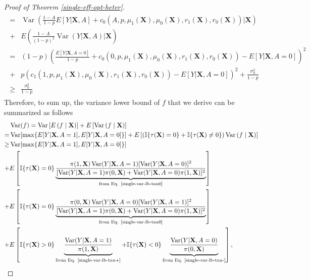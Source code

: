 \documentclass[11pt]{article}
\theoremstyle{referenceplain}
\theoremstyle{referencedefinition}
\theoremstyle{referenceremark}
\begin{document}
\begin{proof}[Proof of Theorem \ref{single-eff-opt-heter}]
\begin{align}
\begin{aligned}
        =&\operatorname{Var}\left(\frac{1-A}{1-p}E[Y|\mathbf{X},A]+c_0(A,p,\mu_1(\mathbf{X}),\mu_0(\mathbf{X}),r_1(\mathbf{X}),r_0(\mathbf{X}))\bigg|\mathbf{X}\right)\\
        +& E\left(\frac{1-A}{(1-p)^2}\operatorname{Var}(Y|\mathbf{X},A)\bigg|\mathbf{X}\right)\\
        =& (1-p)\left(\frac{E[Y|\mathbf{X},A=0]}{1-p}+c_0(0,p,\mu_1(\mathbf{X}),\mu_0(\mathbf{X}),r_1(\mathbf{X}),r_0(\mathbf{X}))-E[Y|\mathbf{X},A=0]\right)^2\\
        +&p\left(c_1(1,p,\mu_1(\mathbf{X}),\mu_0(\mathbf{X}),r_1(\mathbf{X}),r_0(\mathbf{X}))-E[Y|\mathbf{X},A=0]\right)^2+\frac{\sigma_0^2}{1-p}\\
        \ge & \frac{\sigma_0^2}{1-p}
        \end{aligned}
    \end{align}   
Therefore, to sum up, the variance lower bound of $f$ that we derive can be summarized as follows
\begin{align*}
    &\operatorname{Var}(f)=\operatorname{Var}\left[E\left(f\mid \mathbf{X}\right)\right]+E\left[\operatorname{Var}\left(f\mid \mathbf{X}\right)\right] \\
    =&\operatorname{Var}[\max\{E[Y|\mathbf{X},A=1],E[Y|\mathbf{X},A=0]\}]+E\left[(\mathbb{I}\{\tau(\mathbf{X})=0\}+\mathbb{I}\{\tau(\mathbf{X})\neq0\})\operatorname{Var}\left(f\mid \mathbf{X}\right)\right]\\
    \ge&\operatorname{Var}[\max\{E[Y|\mathbf{X},A=1],E[Y|\mathbf{X},A=0]\}]\\
    +&E\left[\mathbb{I}\{\tau(\mathbf{X})=0\}\underbrace{\frac{\pi(1,\mathbf{X})\operatorname{Var}(Y|\mathbf{X},A=1)[\operatorname{Var}(Y|\mathbf{X},A=0)]^2}{[\operatorname{Var}(Y|\mathbf{X},A=1)\pi(0,\mathbf{X})+\operatorname{Var}(Y|\mathbf{X},A=0)\pi(1,\mathbf{X})]^2}}_{\text{from Eq. \eqref{single-var-lb-tau0}}}\right]\\
    +&E\left[\mathbb{I}\{\tau(\mathbf{X})=0\}\underbrace{\frac{\pi(0,\mathbf{X})\operatorname{Var}(Y|\mathbf{X},A=0)[\operatorname{Var}(Y|\mathbf{X},A=1)]^2}{[\operatorname{Var}(Y|\mathbf{X},A=1)\pi(0,\mathbf{X})+\operatorname{Var}(Y|\mathbf{X},A=0)\pi(1,\mathbf{X})]^2}}_{\text{from Eq. \eqref{single-var-lb-tau0}}}\right]\\
    +&E\left[\mathbb{I}\{\tau(\mathbf{X})>0\}\underbrace{\frac{\operatorname{Var}(Y|\mathbf{X},A=1)}{\pi(1,\mathbf{X})}}_{\text{from Eq. \eqref{single-var-lb-tau+}}}+\mathbb{I}\{\tau(\mathbf{X})<0\}\underbrace{\frac{\operatorname{Var}(Y|\mathbf{X},A=0)}{\pi(0,\mathbf{X})}}_{\text{from Eq. \eqref{single-var-lb-tau-}}}\right],

\end{align*}
\end{proof}
\end{document}
